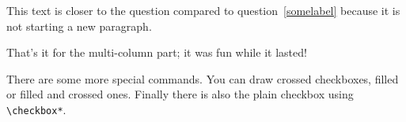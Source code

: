 \documentclass[
  german,
  globalid=Inventionate,
  print_questionnaire_id,
  oneside,
  pagemark,
  stamp]{sdaps}
\begin{document}
\begin{questionnaire}
\begin{multicols}{2}
      This text is closer to the question compared to question~\ref{somelabel}
      because it is not starting a new paragraph.


    \end{multicols}

    That's it for the multi-column part; it was fun while it lasted!

    There are some more special commands. You can draw \checkedbox{} crossed
    checkboxes, \filledbox{} filled or \correctedbox{} filled and crossed ones. Finally there is
    also the plain \checkbox*{} checkbox using {\tt \textbackslash{}checkbox*}.


    \def\checkboxstyle{box}

  \end{questionnaire}
\end{document}
